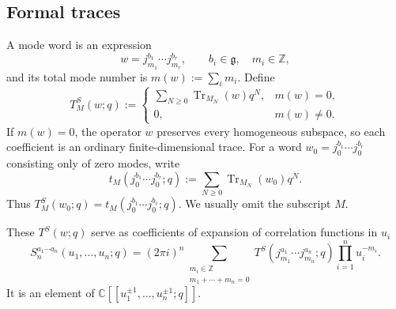 \documentclass[11pt,a4paper]{amsart}
\numberwithin{equation}{section}
\theoremstyle{definition}
\theoremstyle{remark}
\DeclareMathOperator{\Tr}{Tr}
\newcommand{\CC}{\mathbb C}
\newcommand{\ZZ}{\mathbb Z}
\newcommand{\g}{\mathfrak g}
\newcommand{\ii}{i}
\begin{document}
\subsection{Formal traces}

A mode word is an expression
\begin{equation*}
 w=j_{m_1}^{b_1}\cdots j_{m_r}^{b_r},
 \qquad b_i\in\g,\quad m_i\in\ZZ,
\end{equation*}
and its total mode number is $m(w):=\sum_i m_i$.  Define
\begin{equation}
 T^S_M(w;q):=
 \begin{cases}
 \displaystyle
 \sum_{N\geq0}\Tr_{M_N}(w)q^N,&m(w)=0,\\[1.2ex]
 0,&m(w)\neq0.
 \end{cases}
 \label{eq:TS-definition}
\end{equation}
If $m(w)=0$, the operator $w$ preserves every homogeneous subspace, so
each coefficient is an ordinary finite-dimensional trace.  For a word
$w_0=j_0^{b_1}\cdots j_0^{b_r}$ consisting only of zero modes, write
\begin{equation}
 t_M(j_0^{b_1}\cdots j_0^{b_r};q):=
 \sum_{N\geq0}\Tr_{M_N}(w_0)q^N.
 \label{eq:t-zero-word}
\end{equation}
Thus $T^S_M(w_0;q)=t_M(j_0^{b_1}\cdots j_0^{b_r};q)$.  We usually omit the subscript $M$.

These $T^S(w;q)$ serve as coefficients of expansion of correlation functions in $u_i$
\begin{equation}
 S_n^{a_1\cdots a_n}(u_1,\ldots,u_n;q)
 =(2\pi\ii)^n
 \sum_{\substack{m_i\in\ZZ\\m_1+\cdots+m_n=0}}
 T^S(j_{m_1}^{a_1}\cdots j_{m_n}^{a_n};q)
 \prod_{i=1}^n u_i^{-m_i}.
 \label{eq:S-formal-expansion}
\end{equation}
It is an element of
$\CC[[u_1^{\pm1},\ldots,u_n^{\pm1};q]]$.
\end{document}
